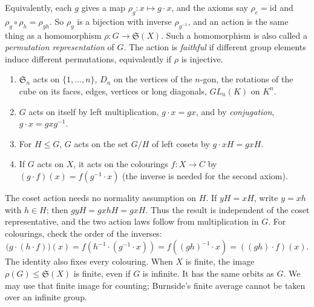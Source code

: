 Equivalently, each $g$ gives a map $\rho_g:x\mapsto g\cdot x$, and the axioms say $\rho_e=\mathrm{id}$ and $\rho_g\circ\rho_h=\rho_{gh}$. So $\rho_g$ is a bijection with inverse $\rho_{g^{-1}}$, and an action is the same thing as a homomorphism $\rho:G\to\mathfrak S(X)$. Such a homomorphism is also called a \emph{permutation representation} of $G$. The action is \emph{faithful} if different group elements induce different permutations, equivalently if $\rho$ is injective.

\begin{example}\label{ex:actions}
\begin{enumerate}[label=(\arabic*)]
\item $\mathfrak S_n$ acts on $\{1,\dots,n\}$, $D_n$ on the vertices of the $n$-gon, the rotations of the cube on its faces, edges, vertices or long diagonals, $GL_n(K)$ on $K^n$.
\item $G$ acts on itself by left multiplication, $g\cdot x=gx$, and by \emph{conjugation}, $g\cdot x=gxg^{-1}$.
\item For $H\le G$, $G$ acts on the set $G/H$ of left cosets by $g\cdot xH=gxH$.
\item If $G$ acts on $X$, it acts on the colourings $f:X\to C$ by $(g\cdot f)(x)=f(g^{-1}\cdot x)$ (the inverse is needed for the second axiom).
\end{enumerate}
\end{example}

The coset action needs no normality assumption on $H$. If $yH=xH$, write
$y=xh$ with $h\in H$; then $gyH=gxhH=gxH$. Thus the result is independent
of the coset representative, and the two action laws follow from multiplication
in $G$. For colourings, check the order of the inverses:
\[
\bigl(g\cdot(h\cdot f)\bigr)(x)
=f(h^{-1}\cdot(g^{-1}\cdot x))
=f((gh)^{-1}\cdot x)=((gh)\cdot f)(x).
\]
The identity also fixes every colouring. When $X$ is finite, the image
$\rho(G)\le\mathfrak S(X)$ is finite, even if $G$ is infinite. It has the
same orbits as $G$. We may use that finite image for counting; Burnside's
finite average cannot be taken over an infinite group.

